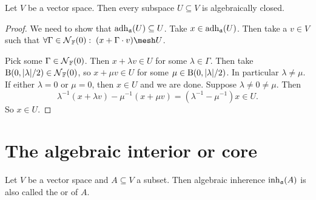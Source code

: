 \begin{lemma}
Let $V$ be a vector space. Then every subspace $U\subseteq V$ is algebraically closed.
\end{lemma}
\begin{proof}
We need to show that $\operatorname{adh}_\mathfrak{a}(U)\subseteq U$. Take $x\in \operatorname{adh}_\mathfrak{a}(U)$. Then take a $v\in V$ such that $\forall \Gamma\in\neighbourhood_\F(0):\; (x+\Gamma\cdot v)\mesh U$.

Pick some $\Gamma\in\operatorname{\mathcal{N}}_{\mathbb{F}}(0)$. Then $x+\lambda v\in U$ for some $\lambda\in \Gamma$. Then take $\operatorname{B}(0,|\lambda|/2)\in \operatorname{\mathcal{N}}_{\mathbb{F}}(0)$, so $x+\mu v\in U$ for some $\mu\in \operatorname{B}(0,|\lambda|/2)$. In particular $\lambda \neq \mu$. If either $\lambda =0$ or $\mu = 0$, then $x\in U$ and we are done. Suppose $\lambda\neq 0 \neq \mu$. Then
\[ \lambda^{-1}(x+\lambda v) - \mu^{-1}(x+\mu v) = (\lambda^{-1} - \mu^{-1})x \in U. \]
So $x\in U$.
\end{proof}

\section{The algebraic interior or core}
\begin{definition}
Let $V$ be a vector space and $A\subseteq V$ a subset. Then algebraic inherence $\operatorname{inh}_\mathfrak{a}(A)$ is also called the  or  of $A$.
\end{definition}

